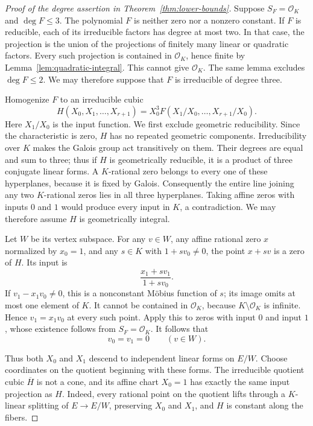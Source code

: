 \documentclass[11pt]{article}
\theoremstyle{definition}
\begin{document}
\begin{proof}[Proof of the degree assertion in Theorem~\ref{thm:lower-bounds}]
Suppose $S_F=\mathcal O_K$ and $\deg F\le3$.
The polynomial $F$ is neither zero nor a nonzero constant.
If $F$ is reducible, each of its irreducible factors has degree at most two.
In that case, the projection is the union of the
projections of finitely many linear or quadratic factors.  Every such
projection is contained in $\mathcal O_K$, hence finite by
Lemma~\ref{lem:quadratic-integral}.  This cannot give $\mathcal O_K$.
The same lemma excludes $\deg F\le2$.
We may therefore suppose that $F$ is irreducible of degree three.

Homogenize $F$ to an irreducible cubic
\[
 H(X_0,X_1,\ldots,X_{r+1})
      =X_0^3 F(X_1/X_0,\ldots,X_{r+1}/X_0).
\]
Here $X_1/X_0$ is the input function.
We first exclude geometric reducibility.  Since the characteristic is zero,
$H$ has no repeated geometric components.  Irreducibility over $K$ makes
the Galois group act transitively on them.  Their degrees are equal and
sum to three; thus if $H$ is geometrically reducible, it is a product of
three conjugate linear forms.  A $K$-rational zero belongs to every one of
these hyperplanes, because it is fixed by Galois.  Consequently the entire
line joining any two $K$-rational zeros lies in all three hyperplanes.
Taking affine zeros with inputs $0$ and $1$ would produce every input in
$K$, a contradiction.  We may therefore assume $H$ is geometrically
integral.

Let $W$ be its vertex subspace.
For any $v\in W$, any affine rational zero $x$ normalized by $x_0=1$,
and any $s\in K$ with $1+s v_0\neq0$, the point $x+sv$ is a zero of $H$.
Its input is
\[
                       \frac{x_1+s v_1}{1+s v_0}.
\]
If $v_1-x_1v_0\neq0$, this is a nonconstant M\"obius function of $s$;
its image omits at most one element of $K$.  It cannot be contained in
$\mathcal O_K$, because $K\setminus\mathcal O_K$ is infinite.
Hence $v_1=x_1v_0$ at every such point.  Apply this to zeros with input
$0$ and input $1$, whose existence follows from $S_F=\mathcal O_K$.
It follows that
\[
                         v_0=v_1=0\qquad(v\in W).
\]

Thus both $X_0$ and $X_1$ descend to independent linear forms on $E/W$.
Choose coordinates on the quotient beginning with these forms.  The
irreducible quotient cubic $\overline H$ is not a cone, and its affine
chart $X_0=1$ has exactly the same input projection as $H$.
Indeed, every rational point on the quotient lifts through a $K$-linear
splitting of $E\to E/W$, preserving $X_0$ and $X_1$, and $H$ is constant
along the fibers.


\end{proof}
\end{document}
